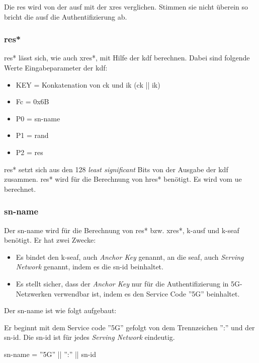 Die \gls{res} wird von der \gls{ausf} mit der \gls{xres} verglichen.
Stimmen sie nicht überein so bricht die \gls{ausf} die Authentifizierung ab. %

\subsubsection{\gls{res*}}
\gls{res*} lässt sich, wie auch \gls{xres*}, mit Hilfe der \gls{kdf} berechnen.
Dabei sind folgende Werte Eingabeparameter der \gls{kdf}: %
\begin{itemize}
\item KEY = Konkatenation von \gls{ck} und \gls{ik} (\gls{ck} || \gls{ik})
\item Fc = 0x6B
\item P0 = \gls{sn-name}
\item P1 = \gls{rand}
\item P2 = \gls{res}
\end{itemize}

\gls{res*} setzt sich aus den 128 \textit{least significant} Bits von der Ausgabe der \gls{kdf} zusammen.
\gls{res*} wird für die Berechnung von \gls{hres*} benötigt.
Es wird vom \gls{ue} berechnet.

\subsubsection{\gls{sn-name}}
Der \gls{sn-name} wird für die Berechnung von \gls{res*} bzw. \gls{xres*}, \gls{k-ausf} und \gls{k-seaf} benötigt.
Er hat zwei Zwecke: %
\begin{itemize}
\item Es bindet den \gls{k-seaf}, auch  \textit{Anchor Key}  genannt, an die \gls{seaf}, auch \textit{Serving Network} genannt, indem es die \gls{sn-id} beinhaltet.
\item Es stellt sicher, dass der \textit{Anchor Key} nur für die Authentifizierung in 5G-Netzwerken verwendbar ist, indem es den Service Code ''5G'' beinhaltet.
\end{itemize}
Der \gls{sn-name} ist wie folgt aufgebaut: %

Er beginnt mit dem Service code ''5G'' gefolgt von dem Trennzeichen '':'' und der \gls{sn-id}.
Die \gls{sn-id} ist für jedes \textit{Serving Network} eindeutig.

\gls{sn-name} = ''5G'' || '':'' || \gls{sn-id}

